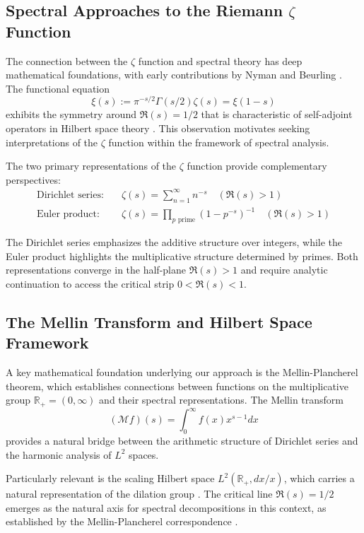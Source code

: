\documentclass[12pt]{article}
\theoremstyle{plain}
\theoremstyle{definition}
\begin{document}
\subsection{Spectral Approaches to the Riemann $\zeta$ Function}

The connection between the $\zeta$ function and spectral theory has deep mathematical foundations, with early contributions by Nyman \cite{nyman1950} and Beurling \cite{beurling1955}. The functional equation \cite{titchmarsh1986}
$$
\xi(s) := \pi^{-s/2}\Gamma(s/2)\zeta(s) = \xi(1-s)
$$
exhibits the symmetry around $\Re(s) = 1/2$ that is characteristic of self-adjoint operators in Hilbert space theory \cite{reed-simon1978}. This observation motivates seeking interpretations of the $\zeta$ function within the framework of spectral analysis.

The two primary representations of the $\zeta$ function provide complementary perspectives:
\begin{align}
\text{Dirichlet series:} \quad &\zeta(s) = \sum_{n=1}^{\infty} n^{-s} \quad (\Re(s) > 1) \\
\text{Euler product:} \quad &\zeta(s) = \prod_{p \text{ prime}} (1-p^{-s})^{-1} \quad (\Re(s) > 1)
\end{align}

The Dirichlet series emphasizes the additive structure over integers, while the Euler product highlights the multiplicative structure determined by primes. Both representations converge in the half-plane $\Re(s) > 1$ and require analytic continuation to access the critical strip $0 < \Re(s) < 1$.

\subsection{The Mellin Transform and Hilbert Space Framework}

A key mathematical foundation underlying our approach is the Mellin-Plancherel theorem, which establishes connections between functions on the multiplicative group $\mathbb{R}_+ = (0,\infty)$ and their spectral representations. The Mellin transform
$$
(\mathcal{M}f)(s) = \int_0^\infty f(x) x^{s-1} dx
$$
provides a natural bridge between the arithmetic structure of Dirichlet series and the harmonic analysis of $L^2$ spaces.

Particularly relevant is the scaling Hilbert space $L^2(\mathbb{R}_+, dx/x)$, which carries a natural representation of the dilation group \cite{walters1982}. The critical line $\Re(s) = 1/2$ emerges as the natural axis for spectral decompositions in this context, as established by the Mellin-Plancherel correspondence \cite{titchmarsh1986}.
\end{document}
